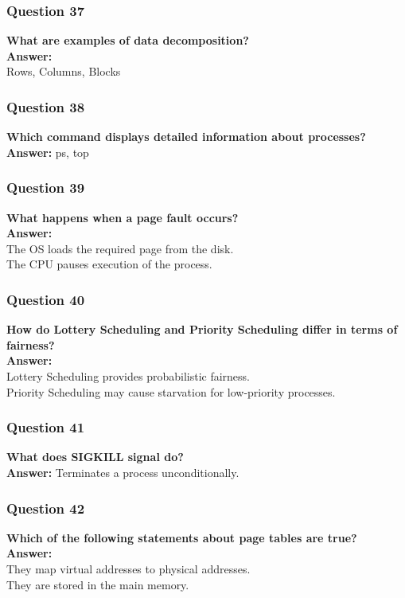 \documentclass{article}
\begin{document}
\subsubsection*{Question 37}
\textbf{What are examples of data decomposition?} \\
\textbf{Answer:} \\ Rows, Columns, Blocks

\subsubsection*{Question 38}
\textbf{Which command displays detailed information about processes?} \\
\textbf{Answer:} ps, top

\subsubsection*{Question 39}
\textbf{What happens when a page fault occurs?} \\
\textbf{Answer:} \\
The OS loads the required page from the disk. \\
The CPU pauses execution of the process.

\subsubsection*{Question 40}
\textbf{How do Lottery Scheduling and Priority Scheduling differ in terms of fairness?} \\
\textbf{Answer:} \\
Lottery Scheduling provides probabilistic fairness. \\
Priority Scheduling may cause starvation for low-priority processes.

\subsubsection*{Question 41}
\textbf{What does SIGKILL signal do?} \\
\textbf{Answer:} Terminates a process unconditionally.

\subsubsection*{Question 42}
\textbf{Which of the following statements about page tables are true?} \\
\textbf{Answer:} \\ 
They map virtual addresses to physical addresses. \\
They are stored in the main memory.
\end{document}
